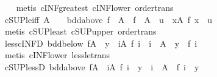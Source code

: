 \begin{isabellebody}
%
\isadelimproof
\ \ %
\endisadelimproof
%
\isatagproof
{}\isamarkupfalse%
\ {\isacharparenleft}{\kern0pt}metis\ cINF{\isacharunderscore}{\kern0pt}greatest\ cINF{\isacharunderscore}{\kern0pt}lower\ order{\isacharunderscore}{\kern0pt}trans{\isacharparenright}{\kern0pt}%
\endisatagproof
{\isafoldproof}%
%
\isadelimproof
\isanewline
%
\endisadelimproof
\isanewline
{}\isamarkupfalse%
\ cSUP{\isacharunderscore}{\kern0pt}le{\isacharunderscore}{\kern0pt}iff{\isacharcolon}{\kern0pt}\ {\isachardoublequoteopen}A\ {\isasymnoteq}\ {\isacharbraceleft}{\kern0pt}{\isacharbraceright}{\kern0pt}\ {\isasymLongrightarrow}\ bdd{\isacharunderscore}{\kern0pt}above\ {\isacharparenleft}{\kern0pt}f\ {\isacharbackquote}{\kern0pt}\ A{\isacharparenright}{\kern0pt}\ {\isasymLongrightarrow}\ {\isasymSqunion}{\isacharparenleft}{\kern0pt}f\ {\isacharbackquote}{\kern0pt}\ A{\isacharparenright}{\kern0pt}\ {\isasymle}\ u\ {\isasymlongleftrightarrow}\ {\isacharparenleft}{\kern0pt}{\isasymforall}x{\isasymin}A{\isachardot}{\kern0pt}\ f\ x\ {\isasymle}\ u{\isacharparenright}{\kern0pt}{\isachardoublequoteclose}\isanewline
%
\isadelimproof
\ \ %
\endisadelimproof
%
\isatagproof
{}\isamarkupfalse%
\ {\isacharparenleft}{\kern0pt}metis\ cSUP{\isacharunderscore}{\kern0pt}least\ cSUP{\isacharunderscore}{\kern0pt}upper\ order{\isacharunderscore}{\kern0pt}trans{\isacharparenright}{\kern0pt}%
\endisatagproof
{\isafoldproof}%
%
\isadelimproof
\isanewline
%
\endisadelimproof
\isanewline
{}\isamarkupfalse%
\ less{\isacharunderscore}{\kern0pt}cINF{\isacharunderscore}{\kern0pt}D{\isacharcolon}{\kern0pt}\ {\isachardoublequoteopen}bdd{\isacharunderscore}{\kern0pt}below\ {\isacharparenleft}{\kern0pt}f{\isacharbackquote}{\kern0pt}A{\isacharparenright}{\kern0pt}\ {\isasymLongrightarrow}\ y\ {\isacharless}{\kern0pt}\ {\isacharparenleft}{\kern0pt}{\isasymSqinter}i{\isasymin}A{\isachardot}{\kern0pt}\ f\ i{\isacharparenright}{\kern0pt}\ {\isasymLongrightarrow}\ i\ {\isasymin}\ A\ {\isasymLongrightarrow}\ y\ {\isacharless}{\kern0pt}\ f\ i{\isachardoublequoteclose}\isanewline
%
\isadelimproof
\ \ %
\endisadelimproof
%
\isatagproof
{}\isamarkupfalse%
\ {\isacharparenleft}{\kern0pt}metis\ cINF{\isacharunderscore}{\kern0pt}lower\ less{\isacharunderscore}{\kern0pt}le{\isacharunderscore}{\kern0pt}trans{\isacharparenright}{\kern0pt}%
\endisatagproof
{\isafoldproof}%
%
\isadelimproof
\isanewline
%
\endisadelimproof
\isanewline
{}\isamarkupfalse%
\ cSUP{\isacharunderscore}{\kern0pt}lessD{\isacharcolon}{\kern0pt}\ {\isachardoublequoteopen}bdd{\isacharunderscore}{\kern0pt}above\ {\isacharparenleft}{\kern0pt}f{\isacharbackquote}{\kern0pt}A{\isacharparenright}{\kern0pt}\ {\isasymLongrightarrow}\ {\isacharparenleft}{\kern0pt}{\isasymSqunion}i{\isasymin}A{\isachardot}{\kern0pt}\ f\ i{\isacharparenright}{\kern0pt}\ {\isacharless}{\kern0pt}\ y\ {\isasymLongrightarrow}\ i\ {\isasymin}\ A\ {\isasymLongrightarrow}\ f\ i\ {\isacharless}{\kern0pt}\ y{\isachardoublequoteclose}\isanewline

\end{isabellebody}
